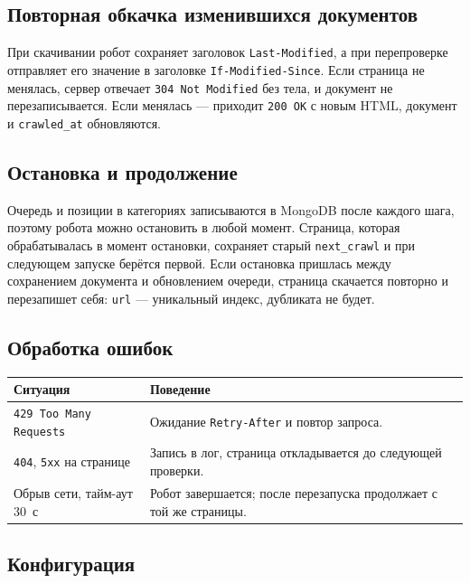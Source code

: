 \documentclass[12pt,a4paper,oneside,fleqn]{article}
\begin{document}
\subsection{Повторная обкачка изменившихся документов}

При скачивании робот сохраняет заголовок \texttt{Last-Modified}, а при перепроверке отправляет его значение в заголовке \texttt{If-Modified-Since}. Если страница не менялась, сервер отвечает \texttt{304 Not Modified} без тела, и документ не перезаписывается. Если менялась --- приходит \texttt{200 OK} с новым HTML, документ и \texttt{crawled\_at} обновляются.

\subsection{Остановка и продолжение}

Очередь и позиции в категориях записываются в MongoDB после каждого шага, поэтому робота можно остановить в любой момент. Страница, которая обрабатывалась в момент остановки, сохраняет старый \texttt{next\_crawl} и при следующем запуске берётся первой. Если остановка пришлась между сохранением документа и обновлением очереди, страница скачается повторно и перезапишет себя: \texttt{url} --- уникальный индекс, дубликата не будет.

\subsection{Обработка ошибок}

\begin{longtable}{|p{5.4cm}|p{9.6cm}|}
\hline
\textbf{Ситуация} & \textbf{Поведение} \\
\hline
\texttt{429 Too Many Requests} & Ожидание \texttt{Retry-After} и повтор запроса. \\
\hline
\texttt{404}, \texttt{5xx} на странице & Запись в лог, страница откладывается до следующей проверки. \\
\hline
Обрыв сети, тайм-аут 30~с & Робот завершается; после перезапуска продолжает с той же страницы. \\
\hline
\end{longtable}

\subsection{Конфигурация}
\end{document}
